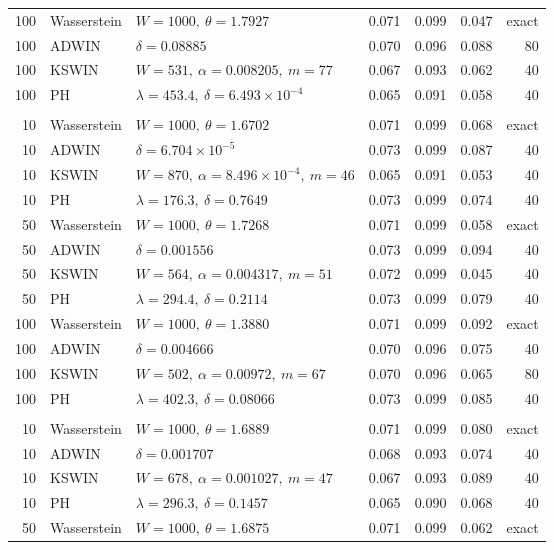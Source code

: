 \documentclass[preprint,12pt]{elsarticle}
\begin{document}
\begin{longtable}{rllrrrr}
100 & Wasserstein & $W=1000,\ \theta=1.7927$ & 0.071 & 0.099 & 0.047 & exact \\*
100 & ADWIN & $\delta=0.08885$ & 0.070 & 0.096 & 0.088 & 80 \\*
100 & KSWIN & $W=531,\ \alpha=0.008205,\ m=77$ & 0.067 & 0.093 & 0.062 & 40 \\*
100 & PH & $\lambda=453.4,\ \delta=6.493\times10^{-4}$ & 0.065 & 0.091 & 0.058 & 40 \\
\addlinespace
\multicolumn{7}{l}{\textit{F1$\to$F2}}\\*
10 & Wasserstein & $W=1000,\ \theta=1.6702$ & 0.071 & 0.099 & 0.068 & exact \\*
10 & ADWIN & $\delta=6.704\times10^{-5}$ & 0.073 & 0.099 & 0.087 & 40 \\*
10 & KSWIN & $W=870,\ \alpha=8.496\times10^{-4},\ m=46$ & 0.065 & 0.091 & 0.053 & 40 \\*
10 & PH & $\lambda=176.3,\ \delta=0.7649$ & 0.073 & 0.099 & 0.074 & 40 \\*
50 & Wasserstein & $W=1000,\ \theta=1.7268$ & 0.071 & 0.099 & 0.058 & exact \\*
50 & ADWIN & $\delta=0.001556$ & 0.073 & 0.099 & 0.094 & 40 \\*
50 & KSWIN & $W=564,\ \alpha=0.004317,\ m=51$ & 0.072 & 0.099 & 0.045 & 40 \\*
50 & PH & $\lambda=294.4,\ \delta=0.2114$ & 0.073 & 0.099 & 0.079 & 40 \\*
100 & Wasserstein & $W=1000,\ \theta=1.3880$ & 0.071 & 0.099 & 0.092 & exact \\*
100 & ADWIN & $\delta=0.004666$ & 0.070 & 0.096 & 0.075 & 40 \\*
100 & KSWIN & $W=502,\ \alpha=0.00972,\ m=67$ & 0.070 & 0.096 & 0.065 & 80 \\*
100 & PH & $\lambda=402.3,\ \delta=0.08066$ & 0.073 & 0.099 & 0.085 & 40 \\
\addlinespace
\multicolumn{7}{l}{\textit{F2$\to$F1}}\\*
10 & Wasserstein & $W=1000,\ \theta=1.6889$ & 0.071 & 0.099 & 0.080 & exact \\*
10 & ADWIN & $\delta=0.001707$ & 0.068 & 0.093 & 0.074 & 40 \\*
10 & KSWIN & $W=678,\ \alpha=0.001027,\ m=47$ & 0.067 & 0.093 & 0.089 & 40 \\*
10 & PH & $\lambda=296.3,\ \delta=0.1457$ & 0.065 & 0.090 & 0.068 & 40 \\*
50 & Wasserstein & $W=1000,\ \theta=1.6875$ & 0.071 & 0.099 & 0.062 & exact \\*

\end{longtable}
\end{document}
